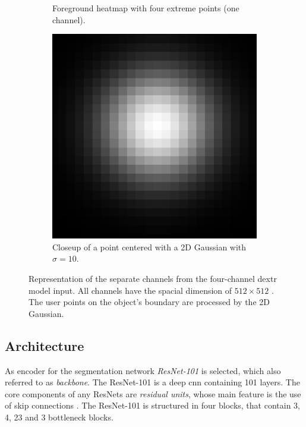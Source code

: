 \begin{figure}
\begin{subfigure}[b]{0.3\textwidth}
		\caption{Foreground heatmap with four extreme points (one channel).}
		\label{fig:ch3:sec3:fg_channel}
	\end{subfigure}
	\hfill
	\begin{subfigure}[b]{0.3\textwidth}
		\centering
		\includegraphics[width=\textwidth]{figures/chap33_gaussian_point.png}
		\caption{Closeup of a point centered with a 2D Gaussian with $\sigma = 10$.}
		\label{fig:ch3:sec3:gauss_centered_point}
	\end{subfigure}
	\caption[Four-channel DEXTR model input]{
		Representation of the separate channels from the four-channel \gls{dextr} model input.
		All channels have the spacial dimension of $512 \times 512$ .
		The user points on the object's boundary are processed by the 2D Gaussian.
	} \label{fig:ch3:sec3:model_input_channels}
\end{figure}


\subsection{Architecture}\label{ord:ch3:sec3:subsec3}

As encoder for the segmentation network \textit{ResNet-101} \cite{He16-ResNet} is selected, which also referred to as \textit{backbone}.
The ResNet-101 is a deep \gls{cnn} containing 101 layers.
The core components of any ResNets are \textit{residual units}, whose main feature is the use of skip connections \cite{Ger17-HandsOn}.
The ResNet-101 is structured in four blocks, that contain 3, 4, 23 and 3 bottleneck blocks.

